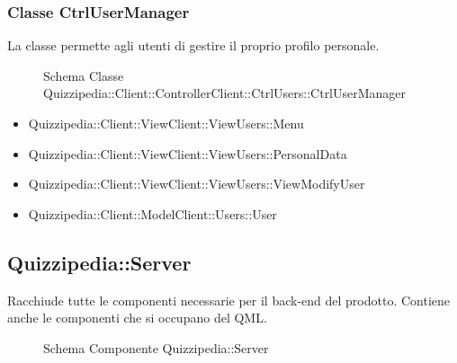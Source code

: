 \subsubsection{Classe CtrlUserManager}
La classe permette agli utenti di gestire il proprio profilo personale.
\begin{figure}[H]
\centering
\noindent{}
\caption{Schema Classe Quizzipedia::Client::ControllerClient::CtrlUsers::CtrlUserManager}
\end{figure}
\begin{itemize}
\item Quizzipedia::Client::ViewClient::ViewUsers::Menu
\item Quizzipedia::Client::ViewClient::ViewUsers::PersonalData
\item Quizzipedia::Client::ViewClient::ViewUsers::ViewModifyUser
\end{itemize}
\begin{itemize}
\item Quizzipedia::Client::ModelClient::Users::User
\end{itemize}
\subsection{Quizzipedia::Server}
Racchiude tutte le componenti necessarie per il back-end del prodotto. Contiene anche le componenti che si occupano del QML.
\begin{figure}[H]
\centering
\noindent{}
\caption[Quizzipedia::Server]{Schema Componente Quizzipedia::Server}
\end{figure}
